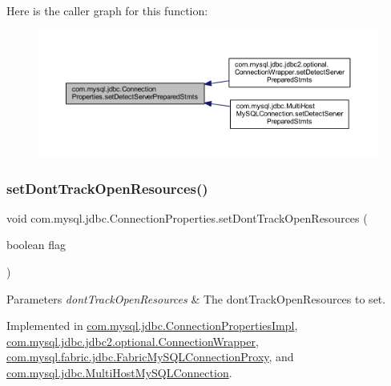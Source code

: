 Here is the caller graph for this function\+:\nopagebreak
\begin{figure}[H]
\begin{center}
\leavevmode
\includegraphics[width=350pt]{interfacecom_1_1mysql_1_1jdbc_1_1_connection_properties_aadfec3198248406f73aea1a634fc3839_icgraph}
\end{center}
\end{figure}
\mbox{\label{interfacecom_1_1mysql_1_1jdbc_1_1_connection_properties_a71698dd42306aa0d570cda6344bc8680}} 
\subsubsection{\texorpdfstring{set\+Dont\+Track\+Open\+Resources()}{setDontTrackOpenResources()}}
{\footnotesize\ttfamily void com.\+mysql.\+jdbc.\+Connection\+Properties.\+set\+Dont\+Track\+Open\+Resources (\begin{DoxyParamCaption}\item[{boolean}]{flag }\end{DoxyParamCaption})}


\begin{DoxyParams}{Parameters}
{\em dont\+Track\+Open\+Resources} & The dont\+Track\+Open\+Resources to set. \\
\hline
\end{DoxyParams}


Implemented in \mbox{\hyperlink{classcom_1_1mysql_1_1jdbc_1_1_connection_properties_impl_ac68d654ad20072f4dc67c5a4aa576c8b}{com.\+mysql.\+jdbc.\+Connection\+Properties\+Impl}}, \mbox{\hyperlink{classcom_1_1mysql_1_1jdbc_1_1jdbc2_1_1optional_1_1_connection_wrapper_abae4382f9155415413562a3593b61a5d}{com.\+mysql.\+jdbc.\+jdbc2.\+optional.\+Connection\+Wrapper}}, \mbox{\hyperlink{classcom_1_1mysql_1_1fabric_1_1jdbc_1_1_fabric_my_s_q_l_connection_proxy_a10bc7147a2f1624e36b3631cc9547e6e}{com.\+mysql.\+fabric.\+jdbc.\+Fabric\+My\+S\+Q\+L\+Connection\+Proxy}}, and \mbox{\hyperlink{classcom_1_1mysql_1_1jdbc_1_1_multi_host_my_s_q_l_connection_a1a0edce81558c2e961ddf936a2410fe3}{com.\+mysql.\+jdbc.\+Multi\+Host\+My\+S\+Q\+L\+Connection}}.

